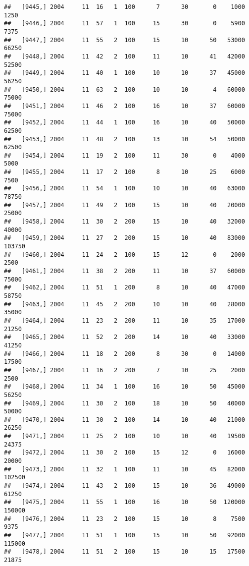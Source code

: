 \documentclass{article}\usepackage[]{graphicx}\usepackage[]{color}
\makeatletter
\newenvironment{kframe}{%
 \def\at@end@of@kframe{}%
 \ifinner\ifhmode%
  \def\at@end@of@kframe{\end{minipage}}%
  \begin{minipage}{\columnwidth}%
 \fi\fi%
 \def\FrameCommand##1{\hskip\@totalleftmargin \hskip-\fboxsep
 \colorbox{shadecolor}{##1}\hskip-\fboxsep
     \hskip-\linewidth \hskip-\@totalleftmargin \hskip\columnwidth}%
 \MakeFramed {\advance\hsize-\width
   \@totalleftmargin\z@ \linewidth\hsize
   \@setminipage}}%
 {\par\unskip\endMakeFramed%
 \at@end@of@kframe}
\newenvironment{knitrout}{}{} %
\makeatother
\begin{document}
\begin{knitrout}
\begin{kframe}
\begin{verbatim}
##   [9445,] 2004     11  16   1  100      7      30       0    1000    1250
##   [9446,] 2004     11  57   1  100     15      30       0    5900    7375
##   [9447,] 2004     11  55   2  100     15      10      50   53000   66250
##   [9448,] 2004     11  42   2  100     11      10      41   42000   52500
##   [9449,] 2004     11  40   1  100     10      10      37   45000   56250
##   [9450,] 2004     11  63   2  100     10      10       4   60000   75000
##   [9451,] 2004     11  46   2  100     16      10      37   60000   75000
##   [9452,] 2004     11  44   1  100     16      10      40   50000   62500
##   [9453,] 2004     11  48   2  100     13      10      54   50000   62500
##   [9454,] 2004     11  19   2  100     11      30       0    4000    5000
##   [9455,] 2004     11  17   2  100      8      10      25    6000    7500
##   [9456,] 2004     11  54   1  100     10      10      40   63000   78750
##   [9457,] 2004     11  49   2  100     15      10      40   20000   25000
##   [9458,] 2004     11  30   2  200     15      10      40   32000   40000
##   [9459,] 2004     11  27   2  200     15      10      40   83000  103750
##   [9460,] 2004     11  24   2  100     15      12       0    2000    2500
##   [9461,] 2004     11  38   2  200     11      10      37   60000   75000
##   [9462,] 2004     11  51   1  200      8      10      40   47000   58750
##   [9463,] 2004     11  45   2  200     10      10      40   28000   35000
##   [9464,] 2004     11  23   2  200     11      10      35   17000   21250
##   [9465,] 2004     11  52   2  200     14      10      40   33000   41250
##   [9466,] 2004     11  18   2  200      8      30       0   14000   17500
##   [9467,] 2004     11  16   2  200      7      10      25    2000    2500
##   [9468,] 2004     11  34   1  100     16      10      50   45000   56250
##   [9469,] 2004     11  30   2  100     18      10      50   40000   50000
##   [9470,] 2004     11  30   2  100     14      10      40   21000   26250
##   [9471,] 2004     11  25   2  100     10      10      40   19500   24375
##   [9472,] 2004     11  30   2  100     15      12       0   16000   20000
##   [9473,] 2004     11  32   1  100     11      10      45   82000  102500
##   [9474,] 2004     11  43   2  100     15      10      36   49000   61250
##   [9475,] 2004     11  55   1  100     16      10      50  120000  150000
##   [9476,] 2004     11  23   2  100     15      10       8    7500    9375
##   [9477,] 2004     11  51   1  100     15      10      50   92000  115000
##   [9478,] 2004     11  51   2  100     15      10      15   17500   21875

\end{verbatim}
\end{kframe}
\end{knitrout}
\end{document}
